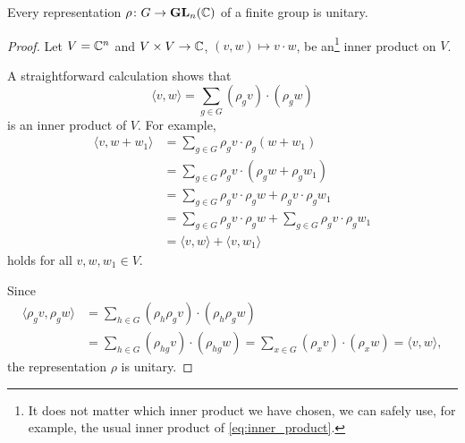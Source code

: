 \begin{theorem}[Weyl]
    Every representation $\rho\colon G\to\mathbf{GL}_n(\mathbb{C})$ 
    of a finite group is unitary.
\end{theorem}

\begin{proof}
    Let $V=\mathbb{C}^n$ and 
    $V\times V\to\mathbb{C}$, $(v,w)\mapsto v\cdot w$, be an\footnote{It does not matter which inner product we have chosen, we can safely use, for example, the usual inner product of \eqref{eq:inner_product}.} inner
    product on $V$. 
   
    A straightforward calculation shows that
    \[
    \langle v,w\rangle=\sum_{g\in G}(\rho_gv)\cdot (\rho_gw)
    \]
    is an inner product of $V$. For example, 
    \begin{align*}
    \langle v,w+w_1\rangle&=\sum_{g\in G}\rho_gv\cdot\rho_g(w+w_1)\\
    &=\sum_{g\in G}\rho_gv\cdot \left(\rho_gw+\rho_gw_1\right)\\
    &=\sum_{g\in G}\rho_gv\cdot \rho_gw+\rho_gv\cdot\rho_gw_1\\
    &=\sum_{g\in G}\rho_gv\cdot \rho_gw+\sum_{g\in G}\rho_gv\cdot \rho_gw_1\\
    &=\langle v,w\rangle+\langle v,w_1\rangle 
    \end{align*}
    holds for all $v,w,w_1\in V$. 
    
    Since
    \begin{align*}
    \langle\rho_gv,\rho_gw\rangle&=\sum_{h\in G}(\rho_h\rho_gv)\cdot(\rho_h\rho_gw)\\
    &=\sum_{h\in G}(\rho_{hg}v)\cdot(\rho_{hg}w)=\sum_{x\in G}(\rho_xv)\cdot(\rho_xw)=\langle v,w\rangle,
    \end{align*}
    the representation $\rho$ is unitary.
\end{proof}


